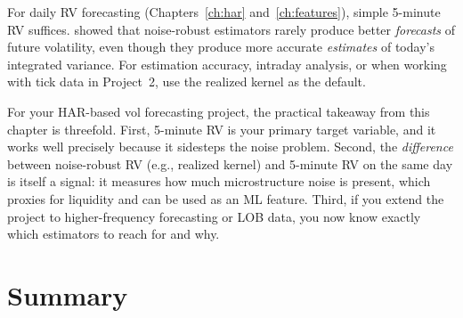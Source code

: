 \begin{keyidea}
For daily RV forecasting (Chapters~\ref{ch:har} and~\ref{ch:features}), simple 5-minute RV suffices.
\citet{LPS2015} showed that noise-robust estimators rarely produce better \emph{forecasts} of future volatility, even though they produce more accurate \emph{estimates} of today's integrated variance.
For estimation accuracy, intraday analysis, or when working with tick data in Project~2, use the realized kernel as the default.
\end{keyidea}

\begin{projectconnection}
For your HAR-based vol forecasting project, the practical takeaway from this chapter is threefold.
First, 5-minute RV is your primary target variable, and it works well precisely because it sidesteps the noise problem.
Second, the \emph{difference} between noise-robust RV (e.g., realized kernel) and 5-minute RV on the same day is itself a signal: it measures how much microstructure noise is present, which proxies for liquidity and can be used as an ML feature.
Third, if you extend the project to higher-frequency forecasting or LOB data, you now know exactly which estimators to reach for and why.
\end{projectconnection}


\section*{Summary}


